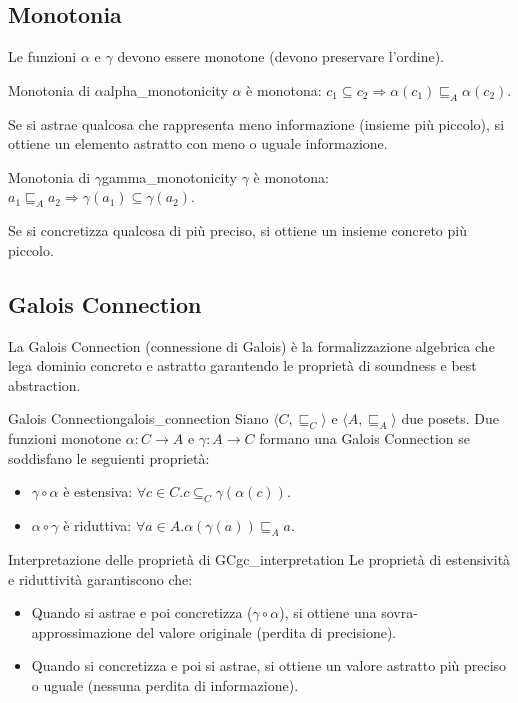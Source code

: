 \subsection{Monotonia}

Le funzioni $\alpha$ e $\gamma$ devono essere monotone (devono preservare
l'ordine).

\begin{teorema}{Monotonia di $\alpha$}{alpha_monotonicity}
$\alpha$ è monotona: $c_1 \subseteq c_2 \Rightarrow \alpha(c_1) \sqsubseteq_A \alpha(c_2)$.

Se si astrae qualcosa che rappresenta meno informazione (insieme più piccolo),
si ottiene un elemento astratto con meno o uguale informazione.
\end{teorema}

\begin{teorema}{Monotonia di $\gamma$}{gamma_monotonicity}
$\gamma$ è monotona: $a_1 \sqsubseteq_A a_2 \Rightarrow \gamma(a_1) \subseteq \gamma(a_2)$.

Se si concretizza qualcosa di più preciso, si ottiene un insieme concreto
più piccolo.
\end{teorema}

\subsection{Galois Connection}

La Galois Connection (connessione di Galois) è la formalizzazione algebrica
che lega dominio concreto e astratto garantendo le proprietà di soundness e
best abstraction.

\begin{definizione}{Galois Connection}{galois_connection}
Siano $\langle C, \sqsubseteq_C \rangle$ e $\langle A, \sqsubseteq_A \rangle$
due posets. Due funzioni monotone $\alpha: C \rightarrow A$ e
$\gamma: A \rightarrow C$ formano una Galois Connection se soddisfano le
seguienti proprietà:
\begin{itemize}
\item $\gamma \circ \alpha$ è estensiva: $\forall c \in C . c \subseteq_C \gamma(\alpha(c))$.
\item $\alpha \circ \gamma$ è riduttiva: $\forall a \in A . \alpha(\gamma(a)) \sqsubseteq_A a$.
\end{itemize}
\end{definizione}

\begin{nota}{Interpretazione delle proprietà di GC}{gc_interpretation}
Le proprietà di estensività e riduttività garantiscono che:
\begin{itemize}
    \item Quando si astrae e poi concretizza ($\gamma \circ \alpha$), si
    ottiene una sovra-approssimazione del valore originale (perdita di
    precisione).
    \item Quando si concretizza e poi si astrae, si ottiene un valore astratto
    più preciso o uguale (nessuna perdita di informazione).
\end{itemize}
\end{nota}


